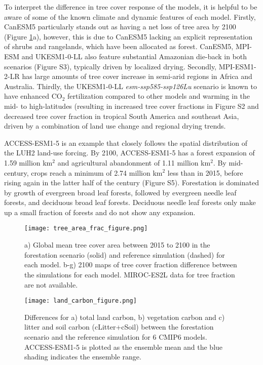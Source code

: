 \documentclass[draft]{agujournal2019}
\begin{document}
To interpret the difference in tree cover response of the models, it is helpful to be aware of some of the known climate and dynamic features of each model.
Firstly, CanESM5 particularly stands out as having a net loss of tree area by 2100 (Figure \ref{fig:land_use_map}a), however, this is due to CanESM5 lacking an explicit representation of shrubs and rangelands, which have been allocated as forest.
CanESM5, MPI-ESM and UKESM1-0-LL also feature substantial Amazonian die-back in both scenarios (Figure S3), typically driven by localized drying.
Secondly, MPI-ESM1-2-LR has large amounts of tree cover increase in semi-arid regions in Africa and Australia.
Thirdly, the UKESM1-0-LL \textit{esm-ssp585-ssp126Lu} scenario is known to have enhanced CO$_2$ fertilization compared to other models and warming in the mid- to high-latitudes (resulting in increased tree cover fractions in Figure S2 and decreased tree cover fraction in tropical South America and southeast Asia, driven by a combination of land use change and regional drying trends.

ACCESS-ESM1-5 is an example that closely follows the spatial distribution of the LUH2 land-use forcing.
By 2100, ACCESS-ESM1-5 has a forest expansion of 1.59 million km$^2$ and agricultural abandonment of 1.11 million km$^2$.
By mid-century, crops reach a minimum of 2.74 million km$^2$ less than in 2015, before rising again in the latter half of the century (Figure S5).
Forestation is dominated by growth of evergreen broad leaf forests, followed by evergreen needle leaf forests, and deciduous broad leaf forests.
Deciduous needle leaf forests only make up a small fraction of forests and do not show any expansion.

\begin{figure}
    \texttt{[image: tree\_area\_frac\_figure.png]}
    \caption{a) Global mean tree cover area between 2015 to 2100 in the forestation scenario (solid) and reference simulation (dashed) for each model. b-g) 2100 maps of tree cover fraction difference between the simulations for each model. MIROC-ES2L data for tree fraction are not available.}
    \label{fig:land_use_map}
\end{figure}

\begin{figure}
    \texttt{[image: land\_carbon\_figure.png]}
    \caption{Differences for a) total land carbon, b) vegetation carbon and c) litter and soil carbon (cLitter+cSoil) between the forestation scenario and the reference simulation for 6 CMIP6 models. ACCESS-ESM1-5 is plotted as the ensemble mean and the blue shading indicates the ensemble range.}
    \label{fig:models_cpools}
\end{figure}
\end{document}
